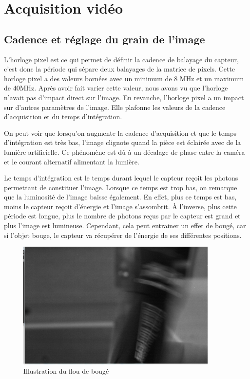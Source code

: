 \section{Acquisition vidéo}

\subsection{Cadence et réglage du grain de l'image}

L'horloge pixel est ce qui permet de définir la cadence de balayage du capteur, c'est donc la période qui sépare deux
balayages de la matrice de pixels. Cette horloge pixel a des valeurs bornées avec un minimum de 8 MHz et
un maximum de 40MHz. Après avoir fait varier cette valeur, nous avons vu que l'horloge n'avait pas d'impact
direct sur l'image. En revanche, l'horloge pixel a un impact sur d'autres paramètres de l'image. Elle plafonne les valeurs
de la cadence d'acquisition et du temps d'intégration.\newline

On peut voir que lorsqu'on augmente la cadence d'acquisition et que le temps d'intégration est très bas, l'image
clignote quand la pièce est éclairée avec de la lumière artificielle. Ce phénomène est dû à un décalage de phase entre
la caméra et le courant alternatif alimentant la lumière.\newline

Le temps d'intégration est le temps durant lequel le capteur reçoit les photons permettant de constituer l'image.
Lorsque ce temps est trop bas, on remarque que la luminosité de l'image baisse également. En effet, plus ce
temps est bas, moins le capteur reçoit d'énergie et l'image s'assombrit. À l'inverse, plus cette période est longue,
plus le nombre de photons reçus par le capteur est grand et plus l'image est lumineuse. Cependant, cela peut entrainer un effet de bougé,
car si l'objet bouge, le capteur va récupérer de l'énergie de ses différentes positions.\newline

\begin{figure}[H]
      \center
      \includegraphics[width=10cm]{ressources/tp2/flou_de_bouge.PNG}
      \caption{Illustration du flou de bougé}
\end{figure}

